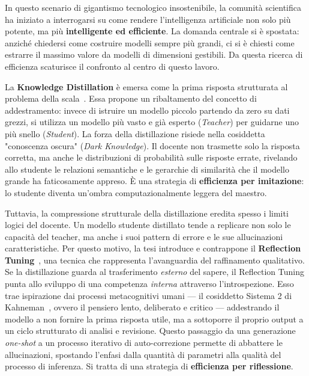 In questo scenario di gigantismo tecnologico insostenibile, la comunità scientifica ha iniziato a interrogarsi su come rendere l'intelligenza artificiale non solo più potente, ma più \textbf{intelligente ed efficiente}. La domanda centrale si è spostata: anziché chiedersi come costruire modelli sempre più grandi, ci si è chiesti come estrarre il massimo valore da modelli di dimensioni gestibili. Da questa ricerca di efficienza scaturisce il confronto al centro di questo lavoro.

La \textbf{Knowledge Distillation} è emersa come la prima risposta strutturata al problema della scala~\cite{hinton2015distilling}. Essa propone un ribaltamento del concetto di addestramento: invece di istruire un modello piccolo partendo da zero su dati grezzi, si utilizza un modello più vasto e già esperto (\textit{Teacher}) per guidarne uno più snello (\textit{Student}). La forza della distillazione risiede nella cosiddetta "conoscenza oscura" (\textit{Dark Knowledge}). Il docente non trasmette solo la risposta corretta, ma anche le distribuzioni di probabilità sulle risposte errate, rivelando allo studente le relazioni semantiche e le gerarchie di similarità che il modello grande ha faticosamente appreso. È una strategia di \textbf{efficienza per imitazione}: lo studente diventa un'ombra computazionalmente leggera del maestro.

Tuttavia, la compressione strutturale della distillazione eredita spesso i limiti logici del docente. Un modello studente distillato tende a replicare non solo le capacità del teacher, ma anche i suoi pattern di errore e le sue allucinazioni caratteristiche. Per questo motivo, la tesi introduce e contrappone il \textbf{Reflection Tuning}~\cite{ze2023reflection}, una tecnica che rappresenta l'avanguardia del raffinamento qualitativo. Se la distillazione guarda al trasferimento \textit{esterno} del sapere, il Reflection Tuning punta allo sviluppo di una competenza \textit{interna} attraverso l'introspezione. Esso trae ispirazione dai processi metacognitivi umani — il cosiddetto Sistema 2 di Kahneman~\cite{kahneman2011thinking}, ovvero il pensiero lento, deliberato e critico — addestrando il modello a non fornire la prima risposta utile, ma a sottoporre il proprio output a un ciclo strutturato di analisi e revisione. Questo passaggio da una generazione \textit{one-shot} a un processo iterativo di auto-correzione permette di abbattere le allucinazioni, spostando l'enfasi dalla quantità di parametri alla qualità del processo di inferenza. Si tratta di una strategia di \textbf{efficienza per riflessione}.

